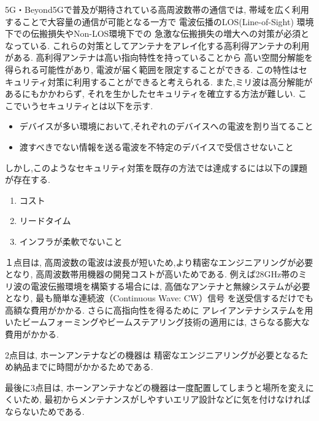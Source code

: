 \documentclass[technicalreport]{ieicej}
\begin{document}
5G・Beyond5Gで普及が期待されている高周波数帯の通信では,
帯域を広く利用することで大容量の通信が可能となる一方で
電波伝播のLOS(Line-of-Sight)
環境下での伝搬損失やNon-LOS環境下での
急激な伝搬損失の増大への対策が必須となっている.
これらの対策としてアンテナをアレイ化する高利得アンテナの利用がある.
高利得アンテナは高い指向特性を持っていることから
高い空間分解能を得られる可能性があり,
電波が届く範囲を限定することができる.
この特性はセキュリティ対策に利用することができると考えられる.
また,ミリ波は高分解能があるにもかかわらず,
それを生かしたセキュリティを確立する方法が難しい.
ここでいうセキュリティとは以下を示す.

\begin{itemize}
  \item デバイスが多い環境において,それぞれのデバイスへの電波を割り当てること
  \item 渡すべきでない情報を送る電波を不特定のデバイスで受信させないこと
\end{itemize}

しかし,このようなセキュリティ対策を既存の方法では達成するには以下の課題が存在する.

\begin{enumerate}
  \item コスト
  \item リードタイム
  \item インフラが柔軟でないこと
\end{enumerate}

１点目は,
高周波数の電波は波長が短いため,より精密なエンジニアリングが必要となり,
高周波数帯用機器の開発コストが高いためである.
例えば28GHz帯のミリ波の電波伝搬環境を構築する場合には,
高価なアンテナと無線システムが必要となり,
最も簡単な連続波（Continuous Wave: CW）信号
を送受信するだけでも高額な費用がかかる\cite{zep}.
さらに高指向性を得るために
アレイアンテナシステムを用いたビームフォーミングやビームステアリング技術の適用には,
さらなる膨大な費用がかかる.

2点目は,
ホーンアンテナなどの機器は
精密なエンジニアリングが必要となるため納品までに時間がかかるためである.

最後に3点目は,
ホーンアンテナなどの機器は一度配置してしまうと場所を変えにくいため,
最初からメンテナンスがしやすいエリア設計などに気を付けなければならないためである.
\end{document}
